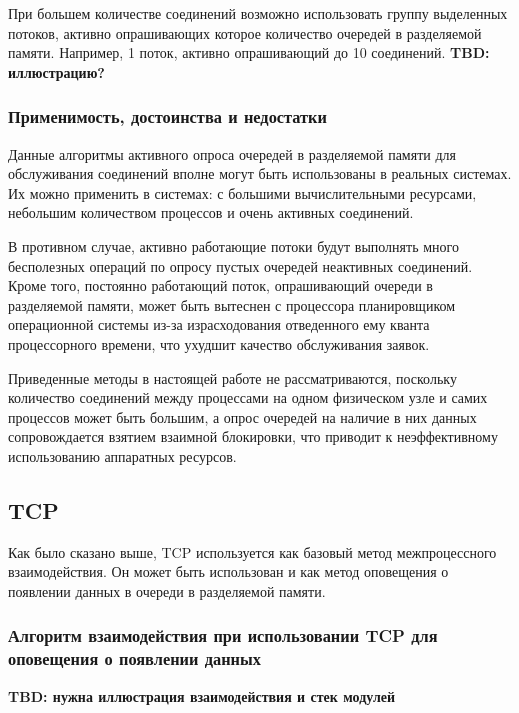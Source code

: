 При большем количестве соединений возможно использовать группу выделенных потоков, активно опрашивающих которое количество очередей в разделяемой памяти. Например, 1 поток, активно опрашивающий до 10 соединений.
\textbf{TBD: иллюстрацию?}

\subsubsection{Применимость, достоинства и недостатки}\label{chapter31:NaivePolling}

Данные алгоритмы активного опроса очередей в разделяемой памяти для обслуживания соединений вполне могут быть использованы в реальных системах. Их можно применить в системах: с большими вычислительными ресурсами, небольшим количеством процессов и очень активных соединений.

В противном случае, активно работающие потоки будут выполнять много бесполезных операций по опросу пустых очередей неактивных соединений. Кроме того, постоянно работающий поток, опрашивающий очереди в разделяемой памяти, может быть вытеснен с процессора планировщиком операционной системы из-за израсходования отведенного ему кванта процессорного времени, что ухудшит качество обслуживания заявок.

Приведенные методы в настоящей работе не рассматриваются, поскольку количество соединений между процессами на одном физическом узле и самих процессов может быть большим, а опрос очередей на наличие в них данных сопровождается взятием взаимной блокировки, что приводит к неэффективному использованию аппаратных ресурсов.

\subsection{TCP}\label{chapter31:SignalTCP}

Как было сказано выше, TCP используется как базовый метод межпроцессного взаимодействия. Он может быть использован и как метод оповещения о появлении данных в очереди в разделяемой памяти.

\subsubsection{Алгоритм взаимодействия при использовании TCP для оповещения о появлении данных}

\textbf{TBD: нужна иллюстрация взаимодействия и стек модулей}

